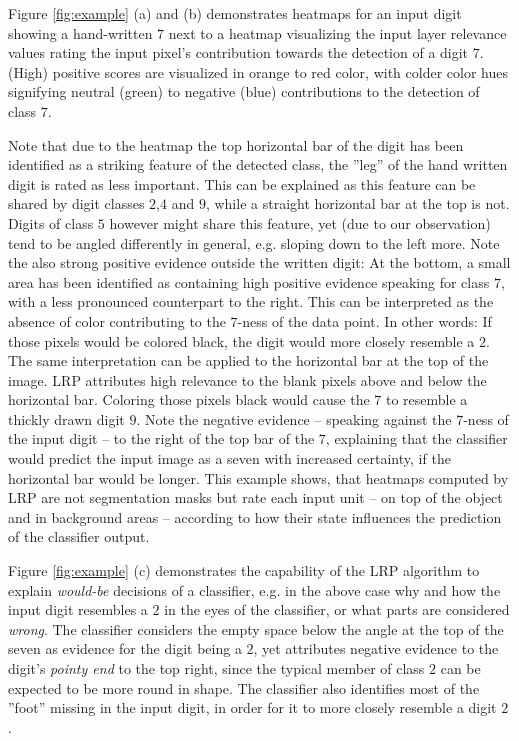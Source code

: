 \documentclass[a4wide]{article}
\begin{document}
Figure \ref{fig:example} (a) and (b) demonstrates heatmaps for an input digit showing a hand-written $7$ next to a heatmap visualizing the input layer relevance values rating the input pixel's contribution towards the detection of a digit $7$. (High) positive scores are visualized in orange to red color, with colder color hues signifying neutral (green) to negative (blue) contributions to the detection of class $7$.

Note that due to the heatmap the top horizontal bar of the digit has been identified as a striking feature of the detected class, the ''leg'' of the hand written digit is rated as less important. This can be explained as this feature can be shared by digit classes $2$,$4$ and $9$, while a straight horizontal bar at the top is not. Digits of class $5$ however might share this feature, yet (due to our observation) tend to be angled differently in general, e.g. sloping down to the left more. Note the also strong positive evidence outside the written digit: At the bottom, a small area has been identified as containing high positive evidence speaking for class $7$, with a less pronounced counterpart to the right. This can be interpreted as the absence of color contributing to the $7$-ness of the data point. In other words: If those pixels would be colored black, the digit would more closely resemble a $2$. The same interpretation can be applied to the horizontal bar at the top of the image. LRP attributes high relevance to the blank pixels above and below the horizontal bar. Coloring those pixels black would cause the $7$ to resemble a thickly drawn digit $9$. Note the negative evidence -- speaking against the $7$-ness of the input digit -- to the right of the top bar of the $7$, explaining that the classifier would predict the input image as a seven with increased certainty, if the horizontal bar would be longer. This example shows, that heatmaps computed by LRP are not segmentation masks but rate each input unit -- on top of the object and in background areas -- according to how their state influences the prediction of the classifier output.

Figure \ref{fig:example} (c) demonstrates the capability of the LRP algorithm to explain \emph{would-be} decisions of a classifier, e.g. in the above case why and how the input digit resembles a $2$ in the eyes of the classifier, or what parts are considered \emph{wrong}. The classifier considers the empty space below the angle at the top of the seven as evidence for the digit being a $2$, yet attributes negative evidence to the digit's \emph{pointy end} to the top right, since the typical member of class $2$ can be expected to be more round in shape. The classifier also identifies most of the ''foot'' missing in the input digit, in order for it to more closely resemble a digit $2$.
\end{document}
